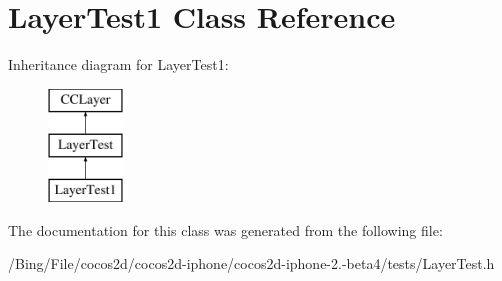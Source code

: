 \hypertarget{interface_layer_test1}{\section{Layer\-Test1 Class Reference}
\label{interface_layer_test1}
}
Inheritance diagram for Layer\-Test1\-:\begin{figure}[H]
\begin{center}
\leavevmode
\includegraphics[height=3.000000cm]{interface_layer_test1}
\end{center}
\end{figure}


The documentation for this class was generated from the following file\-:\begin{DoxyCompactItemize}
\item 
/\-Bing/\-File/cocos2d/cocos2d-\/iphone/cocos2d-\/iphone-\/2.-\/beta4/tests/Layer\-Test.\-h\end{DoxyCompactItemize}
